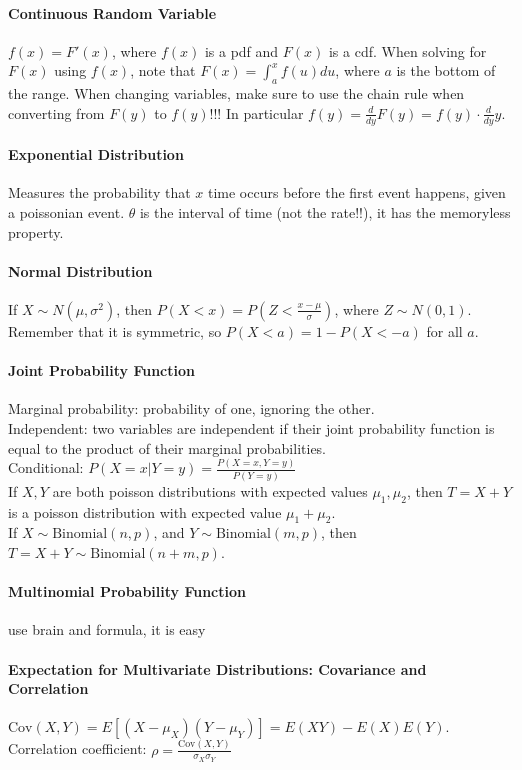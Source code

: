\documentclass[10pt,letter]{article}
\begin{document}
\paragraph{Continuous Random Variable}
$f(x)=F'(x)$, where $f(x)$ is a pdf and $F(x)$ is a cdf. When solving for $F(x)$ using $f(x)$, note that $F(x)=\int_a^xf(u)du$, where $a$ is the bottom of the range. When changing variables, make sure to use the chain rule when converting from $F(y)$ to $f(y)$!!! In particular $f(y)=\frac{d}{dy}F(y)=f(y)\cdot\frac{d}{dy}y$. 
\paragraph{Exponential Distribution}
Measures the probability that $x$ time occurs before the first event happens, given a poissonian event. $\theta$ is the interval of time (not the rate!!), it has the memoryless property. 
\paragraph{Normal Distribution}
If $X\sim N(\mu,\sigma^2)$, then $P(X<x)=P\left(Z<\frac{x-\mu}{\sigma}\right)$, where $Z\sim N(0,1)$. Remember that it is symmetric, so $P(X<a)=1-P(X<-a)$ for all $a$. 

\paragraph{Joint Probability Function}
Marginal probability: probability of one, ignoring the other. \\ 
Independent: two variables are independent if their joint probability function is equal to the product of their marginal probabilities. \\ 
Conditional: $P(X=x|Y=y)=\frac{P(X=x,Y=y)}{P(Y=y)}$ \\ 
If $X,Y$ are both poisson distributions with expected values $\mu_1,\mu_2$, then $T=X+Y$ is a poisson distribution with expected value $\mu_1+\mu_2$. \\ 
If $X\sim\text{Binomial}(n,p)$, and $Y\sim\text{Binomial}(m,p)$, then $T=X+Y\sim\text{Binomial}(n+m,p)$. \\ 

\paragraph{Multinomial Probability Function}
use brain and formula, it is easy 

\paragraph{Expectation for Multivariate Distributions: Covariance and Correlation}
$\text{Cov}(X,Y)=E[(X-\mu_X)(Y-\mu_Y)]=E(XY)-E(X)E(Y)$.  \\ 
Correlation coefficient: $\rho=\frac{\text{Cov}(X,Y)}{\sigma_X\sigma_Y}$ 
\end{document}
